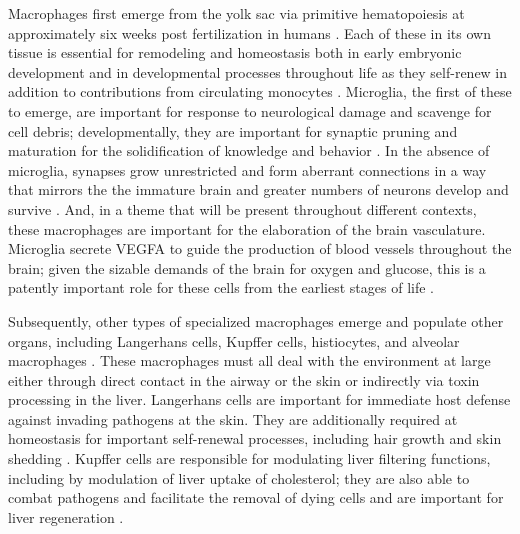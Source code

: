 Macrophages first emerge from the yolk sac via primitive hematopoiesis at approximately six weeks post fertilization in humans \citep{Geissmann2010, Yona2013, Feyaerts2022}. Each of these in its own tissue is essential for remodeling and homeostasis both in early embryonic development and in developmental processes throughout life as they self\hyp{}renew in addition to contributions from circulating monocytes \citep{Jappinen2019}. Microglia, the first of these to emerge, are important for response to neurological damage and scavenge for cell debris; developmentally, they are important for synaptic pruning and maturation for the solidification of knowledge and behavior \citep{Wynn2013, Lavin2015}. In the absence of microglia, synapses grow unrestricted and form aberrant connections in a way that mirrors the the immature brain and greater numbers of neurons develop and survive \citep{Hammond2018}. And, in a theme that will be present throughout different contexts, these macrophages are important for the elaboration of the brain vasculature. Microglia secrete VEGFA to guide the production of blood vessels throughout the brain; given the sizable demands of the brain for oxygen and glucose, this is a patently important role for these cells from the earliest stages of life \citep{Dudiki2020}. 

Subsequently, other types of specialized macrophages emerge and populate other organs, including Langerhans cells, Kupffer cells, histiocytes, and alveolar macrophages \citep{Gordon2017, Davies2013a, Wynn2013, Lavin2015}. These macrophages must all deal with the environment at large either through direct contact in the airway or the skin or indirectly via toxin processing in the liver. Langerhans cells are important for immediate host defense against invading pathogens at the skin. They are additionally required at homeostasis for important self\hyp{}renewal processes, including hair growth and skin shedding \citep{Merad2008, Theret2019}. Kupffer cells are responsible for modulating liver filtering functions, including by modulation of liver uptake of cholesterol; they are also able to combat pathogens and facilitate the removal of dying cells and are important for liver regeneration \citep{Demetz2020, Theret2019}. 

